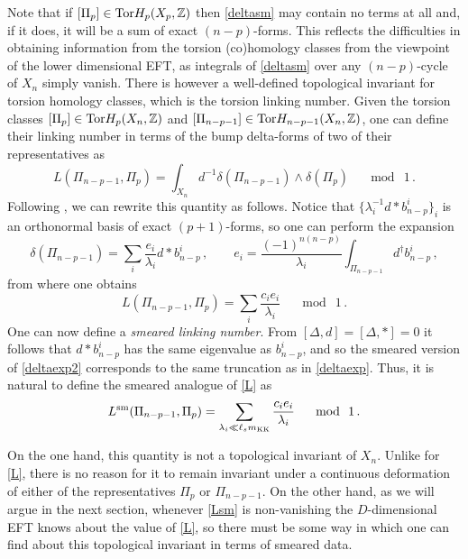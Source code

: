 \documentclass[11pt]{article}
\def\be{\begin{equation}}
\def\ee{\end{equation}}
\newcommand{\IZ}{\mathbb{Z}}
\begin{document}
Note that if $[\Pi_p] \in {\rm Tor} H_p (X_p, \IZ)$ then \eqref{deltasm} may contain no terms at all and, if it does, it will be a sum of exact $(n-p)$-forms. This reflects the difficulties in obtaining information from the torsion (co)homology classes from the viewpoint of the lower dimensional EFT, as integrals of \eqref{deltasm} over any $(n-p)$-cycle of $X_n$  simply vanish. There is however a well-defined topological invariant  for torsion homology classes, which is the torsion linking number. Given the torsion classes $[\Pi_p] \in {\rm Tor} H_p(X_n, \IZ)$ and $[\Pi_{n-p-1}] \in {\rm Tor} H_{n-p-1}(X_n, \IZ)$, one can define their linking number in terms of the bump delta-forms of two of their representatives as \cite{Camara:2011jg}  
\be
L( \Pi_{n-p-1},\Pi_p) = \int_{X_n}  d^{-1}  \delta(\Pi_{n-p-1}) \wedge \delta(\Pi_p)  \quad \mod \ 1 \, .
\ee
Following \cite{Horowitz:1989km}, we can rewrite this quantity as follows. Notice that $\{\lambda_i ^{-1}d*b^i_{n-p}\}_i$ is an orthonormal basis of exact $(p+1)$-forms, so one can perform the expansion 
\be
\delta(\Pi_{n-p-1}) = \sum_i \frac{e_i}{\lambda_i} d*b^i_{n-p} \, ,  \qquad e_i = \frac{(-1)^{n(n-p)}}{\lambda_i}\int_{\Pi_{n-p-1}}d^\dag  b^i_{n-p}\, ,
\label{deltaexp2}
\ee
from where one obtains
\be
L( \Pi_{n-p-1},\Pi_p) = \sum_i \frac{c_ie_i}{\lambda_i}   \quad \mod \ 1 \, .
\label{L}
\ee
One can now define a {\em smeared linking number}. From $[\Delta, d] = [\Delta, *] = 0$ it follows that $d* b_{n-p}^i$ has the same eigenvalue as $b_{n-p}^i$, and so the smeared version of \eqref{deltaexp2} corresponds to the same truncation as in \eqref{deltaexp}. Thus, it is natural to define the smeared analogue of \eqref{L} as
\be
L^{\rm sm}( \Pi_{n-p-1},\Pi_p) = \sum_{\lambda_i \ll \ell_s m_{\rm KK}} \frac{c_ie_i}{\lambda_i}   \quad \mod \ 1 \, .
\label{Lsm}
\ee

On the one hand, this quantity is not a topological invariant of $X_n$. Unlike for \eqref{L}, there is no reason for it to remain invariant under a continuous deformation of either of the representatives $\Pi_p$ or $ \Pi_{n-p-1}$. On the other hand, as we will argue in the next section, whenever \eqref{Lsm} is non-vanishing the $D$-dimensional EFT knows about the value of \eqref{L}, so there must be some way in which one can find about this topological invariant in terms of smeared data. 
\end{document}
